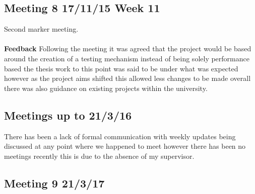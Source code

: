 \subsection{Meeting 8 17/11/15 Week 11}
Second marker meeting.\\\\
\textbf{Feedback}
Following the meeting it was agreed that the project would be based around the creation of a testing mechanism instead of being solely performance based the thesis work to this point was said to be under what was expected however as the project aims shifted this allowed less changes to be made overall there was also guidance on existing projects within the university.


\subsection{Meetings up to 21/3/16}
There has been a lack of formal communication with weekly updates being discussed at any point where we happened to meet however there has been no meetings recently this is due to the absence of my supervisor.    

\subsection{Meeting 9 21/3/17}